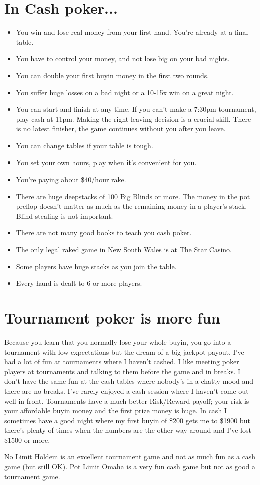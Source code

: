 \section{In Cash poker...}

\begin{itemize}
  \item You win and lose real money from your first hand. You're already
    at a final table.
  \item You have to control your money, and not lose big on your bad nights.
  \item You can double your first buyin money in the first two rounds.
  \item You suffer huge losses on a bad night or a 10-15x win on a great night.
  \item You can start and finish at any time. If you can't make a
    7:30pm tournament, play cash at 11pm. Making the right leaving
    decision is a crucial skill. There is no latest finisher, the game
    continues without you after you leave.
  \item You can change tables if your table is tough.
  \item You set your own hours, play when it's convenient for you.
  \item You're paying about \$40/hour rake.
  \item There are huge deepstacks of 100 Big Blinds or more. The money
    in the pot preflop doesn't matter as much as the remaining money
    in a player's stack. Blind stealing is not important.
  \item There are not many good books to teach you cash poker.
  \item The only legal raked game in New South Wales is at The Star Casino.
  \item Some players have huge stacks as you join the table.
  \item Every hand is dealt to 6 or more players.
\end{itemize}

\section{Tournament poker is more fun}

Because you learn that you normally lose your whole
buyin, you go into a tournament with low expectations but the dream of
a big jackpot payout. I've had a lot of fun at tournaments where I haven't
cashed. I like meeting poker players at tournaments and talking
to them before the game and in breaks. I don't have the same fun
at the cash tables where nobody's in a chatty mood and there are
no breaks. I've rarely enjoyed a cash session where I haven't come out
well in front. Tournaments have a much better Risk/Reward payoff; your
risk is your affordable buyin money and the first prize money is
huge. In cash I sometimes have a good night where my first buyin
of \$200 gets me to \$1900 but there's plenty of times when the
numbers are the other way around and I've lost \$1500 or more.

No Limit Holdem is an excellent tournament game and not as much fun as
a cash game (but still OK). Pot Limit Omaha is a very fun cash game
but not as good a tournament game.
